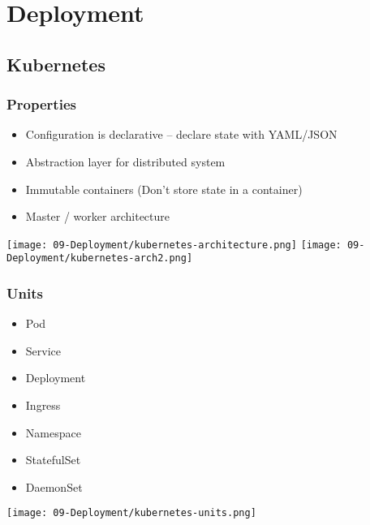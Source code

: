 

\section{Deployment}

\subsection{Kubernetes}
\subsubsection{Properties}
\begin{itemize}
    \item Configuration is declarative – declare state with YAML/JSON 
    \item Abstraction layer for distributed system
    \item Immutable containers (Don’t store state in a container)
    \item Master / worker architecture
\end{itemize}
\begin{center}
    \texttt{[image: 09-Deployment/kubernetes-architecture.png]}
    \texttt{[image: 09-Deployment/kubernetes-arch2.png]}
\end{center}
\vspace{-8pt}

\subsubsection{Units}
\begin{minipage}{.4\linewidth}
    \begin{itemize}
        \item Pod
        \item Service
        \item Deployment
        \item Ingress
        \item Namespace
        \item StatefulSet
        \item DaemonSet
    \end{itemize}    
\end{minipage}
\begin{minipage}{0.5\linewidth}
    \begin{center}
        \texttt{[image: 09-Deployment/kubernetes-units.png]}
    \end{center}    
\end{minipage}

